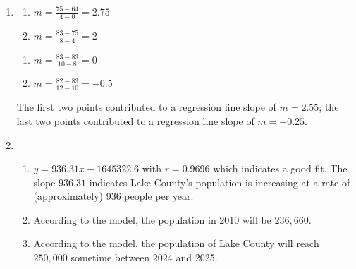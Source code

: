 \begin{enumerate}

\setcounter{enumi}{\value{HW}}

\item

\begin{multicols}{2}

 \begin{enumerate}

\item $m = \frac{75-64}{4-0} = 2.75$ 

\item $m = \frac{83-75}{8-4} = 2$ 

\end{enumerate}

\end{multicols}

\begin{multicols}{2}

\begin{enumerate}

\addtocounter{enumii}{2}

\item  $m = \frac{83-83}{10-8} = 0$

\item  $m = \frac{82-83}{12-10} = -0.5$

\end{enumerate}

\end{multicols}

The first two points contributed to a regression line slope of $m = 2.55$;  the last two points contributed to a regression line slope of $m=-0.25$.

\item  \begin{enumerate}
 

\item  $y = 936.31x - 1645322.6$ with $r=0.9696$ which indicates a good fit.  The slope $936.31$ indicates Lake County's population is increasing at a rate of (approximately) 936 people per year. 

\item  According to the model, the population in 2010 will be $236, \!660$.

\item  According to the model, the population of Lake County will reach $250,\!000$ sometime between 2024 and 2025.

\end{enumerate}


\end{enumerate}
